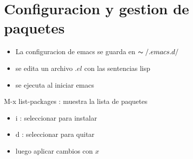 \documentclass[a4paper, twocolumn]{article}
\begin{document}
\begin{landscape}
\begin{multicols}{2}
\begin{flushleft}
\begin{flushleft}
\end{flushleft} 
\end{flushleft}


\section*{Configuracion y gestion de paquetes}

\begin{flushleft}
\begin{itemize}
	\item La configuracion de emacs se guarda en $			\thicksim/.emacs.d/$
	\item se edita un archivo $.el$ con las 				sentencias lisp
	\item se ejecuta al iniciar emacs
\end{itemize}

	\item M-x list-packages : muestra la lista de paquetes
	\begin{itemize}
		\item i : seleccionar para instalar
		\item d : seleccionar para quitar
		\item luego aplicar cambios con $x$
	\end{itemize}
\end{flushleft}


\end{multicols}
\end{landscape}
\end{document}
